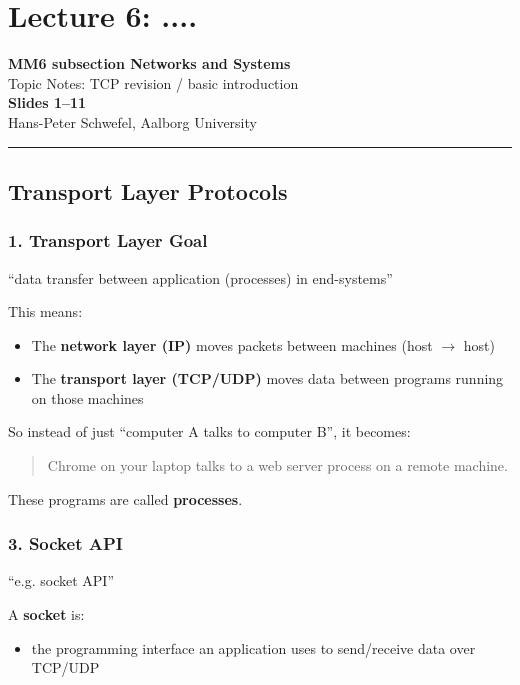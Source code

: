 \chapter{Lecture 6: ....}\label{lec:6}
\begin{center}
  {\LARGE\bfseries\color{aaublue}
    MM6 subsection Networks and Systems}\\[0.4em]
  {\large\color{accentgray}
    Topic Notes: TCP revision / basic introduction}\\[0.2em]
  {\large\bfseries Slides 1--11}\\[0.3em]
  {\small\color{accentgray}
    Hans-Peter Schwefel, Aalborg University}
\end{center}
 
\vspace{0.5em}\hrule\vspace{1em}
\section{Transport Layer Protocols}

\subsection{1. Transport Layer Goal}

“data transfer between application (processes) in end-systems”

This means:
\begin{itemize}
    \item The \textbf{network layer (IP)} moves packets between machines (host $\rightarrow$ host)
    \item The \textbf{transport layer (TCP/UDP)} moves data between programs running on those machines
\end{itemize}

So instead of just “computer A talks to computer B”, it becomes:

\begin{quote}
Chrome on your laptop talks to a web server process on a remote machine.
\end{quote}

These programs are called \textbf{processes}.

\subsection{3. Socket API}

“e.g. socket API”

A \textbf{socket} is:
\begin{itemize}
    \item the programming interface an application uses to send/receive data over TCP/UDP
\end{itemize}

